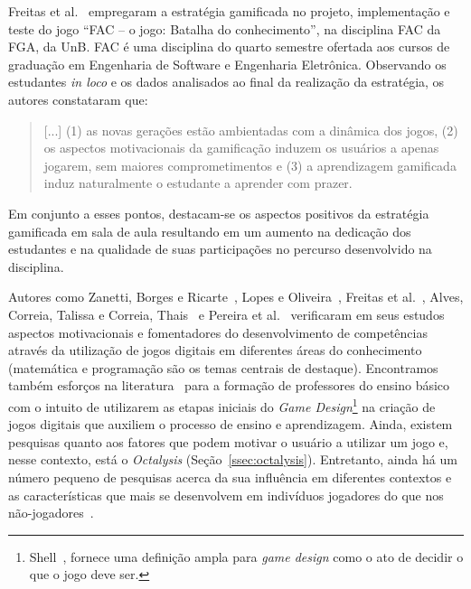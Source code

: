 Freitas et al.~\cite{freitas_gamificacao_2016} empregaram a estratégia gamificada no projeto, implementação e teste do jogo “FAC – o jogo: Batalha do conhecimento”, na disciplina \acrfull{FAC} da \acrfull{FGA}, da \acrfull{UnB}. \acrshort{FAC} é uma disciplina do quarto semestre ofertada aos cursos de graduação em Engenharia de Software e Engenharia Eletrônica. Observando os estudantes \textit{in loco} e os dados analisados ao final da realização da estratégia, os autores constataram que:

\begin{quote}
[...] (1) as novas gerações estão ambientadas com a dinâmica dos jogos, (2) os aspectos motivacionais da gamificação induzem os usuários a apenas jogarem, sem maiores comprometimentos e (3) a aprendizagem gamificada induz naturalmente o estudante a aprender com prazer.~\cite[~p.378]{freitas_gamificacao_2016}
\end{quote}

Em conjunto a esses pontos, destacam-se os aspectos positivos da estratégia gamificada em sala de aula resultando em um aumento na dedicação dos estudantes e na qualidade de suas participações no percurso desenvolvido na disciplina.

Autores como Zanetti, Borges e Ricarte~\cite{zanetti_pensamento_2016}, Lopes e Oliveira~\cite{lopes_videojogos_2013}, Freitas et al.~\cite{freitas_gamificacao_2016},  Alves, Correia, Talissa e Correia, Thais~\cite{correia_revisao_2016} e Pereira et al.~\cite{pereira_jogos_2016} verificaram em seus estudos aspectos motivacionais e fomentadores do desenvolvimento de competências através da utilização de jogos digitais em diferentes áreas do conhecimento (matemática e programação são os temas centrais de destaque). Encontramos também esforços na literatura~\cite{araujo_construcao_2016} para a formação de professores do ensino básico com o intuito de utilizarem as etapas iniciais do \textit{Game Design}\footnote{Shell~\cite{schell_art_2014}, fornece uma definição ampla para \textit{game design} como o ato de decidir o que o jogo deve ser.} na criação de jogos digitais que auxiliem o processo de ensino e aprendizagem. Ainda, existem pesquisas quanto aos fatores que podem motivar o usuário a utilizar um jogo e, nesse contexto, está o \textit{Octalysis} (Seção~\ref{ssec:octalysis}). Entretanto, ainda há um número pequeno de pesquisas acerca da sua influência em diferentes contextos e as características que mais se desenvolvem em indivíduos jogadores do que nos não-jogadores~\cite{correia_revisao_2016}.

